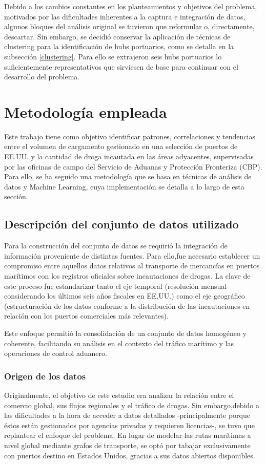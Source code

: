 \documentclass[12pt]{article}
\begin{document}
	Debido a los cambios constantes en los planteamientos y objetivos del problema, motivados por las dificultades inherentes a la captura e integración de datos, algunos bloques del análisis original se tuvieron que reformular o, directamente, descartar. Sin embargo, se decidió conservar la aplicación de técnicas de clustering para la identificación de hubs portuarios, como se detalla en la subsección \ref{clustering}. Para ello se extrajeron seis hubs portuarios lo suficientemente representativos que sirviesen de base para continuar con el desarrollo del problema.
	
\newpage
	
\section{Metodología empleada}	
Este trabajo tiene como objetivo identificar patrones, correlaciones y tendencias entre el volumen de cargamento gestionado en una selección de puertos de EE.UU. y la cantidad de droga incautada en las áreas adyacentes, supervisadas por las oficinas de campo del Servicio de Aduanas y Protección Fronteriza (CBP). Para ello, se ha seguido una metodología que se basa en técnicas de análisis de datos y Machine Learning, cuya implementación se detalla a lo largo de esta sección.

	\subsection{Descripción del conjunto de datos utilizado}
	Para la construcción del conjunto de datos se requirió la integración de información proveniente de distintas fuentes.
	Para ello,fue necesario establecer un compromiso entre aquellos datos relativos al transporte de mercancías en puertos marítimos con los registros oficiales sobre incautaciones de drogas. La clave de este proceso fue estandarizar tanto el eje temporal (resolución mensual considerando los últimos seis años fiscales en EE.UU.) como el eje geográfico (estructuración de los datos conforme a la distribución de las incautaciones en relación con los puertos comerciales más relevantes).
	
	Este enfoque permitió la consolidación de un conjunto de datos homogéneo y coherente, facilitando su análisis en el contexto del tráfico marítimo y las operaciones de control aduanero.
	
		\subsubsection{\label{data origin}Origen de los datos}
		Originalmente, el objetivo de este estudio era analizar la relación entre el comercio global, sus flujos regionales y el tráfico de drogas. Sin embargo,debido a las dificultades a la hora de acceder a datos detallados -principalmente porque éstos están gestionados por agencias privadas y requieren licencias-, se tuvo que replantear el enfoque del problema. En lugar de modelar las rutas marítimas a nivel global mediante grafos de transporte, se optó por tabajar exclusivamente con puertos destino en Estados Unidos, gracias a sus datos abiertos disponibles.
		
\end{document}
